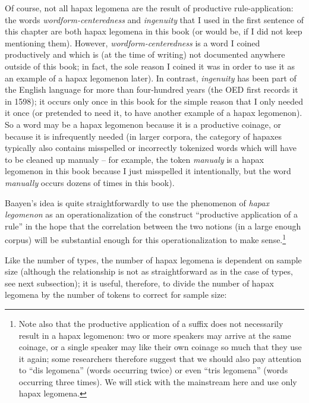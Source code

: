 Of course, not all hapax  legomena are the result of productive rule\hyp{}application: the words \textit{wordform\hyp{}centeredness} and \textit{ingenuity} that I used in the first sentence of this chapter are both hapax legomena in this book (or would be, if I did not keep mentioning them). However, \textit{wordform\hyp{}centeredness} is a word I coined productively  and which is (at the time of writing) not documented anywhere outside of this book; in fact, the sole reason I coined it was in order to use it as an example of a hapax  legomenon later). In contrast, \textit{ingenuity} has been part of the English language for more than four\hyp{}hundred years (the OED  first records it in 1598); it occurs only once in this book for the simple reason that I only needed it once (or pretended to need it, to have another example of a hapax legomenon). So a word may be a hapax  legomenon because it is a productive  coinage, or because it is infrequently needed (in larger  corpora, the category of hapaxes typically also contains misspelled or incorrectly tokenized  words which will have to be cleaned up manualy  -- for example, the token \textit{manualy} is a hapax legomenon in this book because I just misspelled it intentionally, but the word \textit{manually} occurs dozens of times in this book).\largerpage

Baayen's idea is quite straightforwardly to use the phenomenon of \textit{hapax  legomenon} as an operationalization  of the construct ``productive  application of a rule'' in the hope that the correlation between the two notions (in a large  enough corpus) will be substantial enough for this operationalization to make sense.{\footnote{Note also that the productive application of a suffix  does not necessarily result in a hapax  legomenon: two or more speakers may arrive at the same coinage, or a single speaker may like their own coinage so much that they use it again; some researchers therefore suggest that we should also pay attention to ``dis legomena'' (words occurring twice) or even ``tris legomena'' (words occurring three times). We will stick with the mainstream here and use only hapax legomena.}}

Like the number of types,  the number of hapax  legomena is dependent on sample size  (although the relationship is not as straightforward as in the case of types, see next subsection); it is useful, therefore, to divide the number of hapax legomena by the number of tokens  to correct for sample size:

